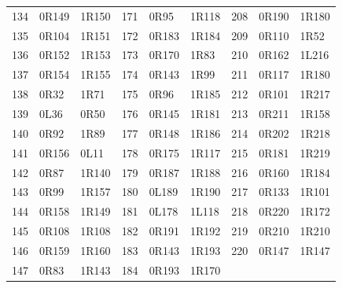 \begin{center}
\begin{tabular}{rll@{\qquad}rll@{\qquad}rll}
134 & 0R149 & 1R150 & 171 & 0R95 & 1R118 & 208 & 0R190 & 1R180\\
135 & 0R104 & 1R151 & 172 & 0R183 & 1R184 & 209 & 0R110 & 1R52\\
136 & 0R152 & 1R153 & 173 & 0R170 & 1R83 & 210 & 0R162 & 1L216\\
137 & 0R154 & 1R155 & 174 & 0R143 & 1R99 & 211 & 0R117 & 1R180\\
138 & 0R32 & 1R71 & 175 & 0R96 & 1R185 & 212 & 0R101 & 1R217\\
139 & 0L36 & 0R50 & 176 & 0R145 & 1R181 & 213 & 0R211 & 1R158\\
140 & 0R92 & 1R89 & 177 & 0R148 & 1R186 & 214 & 0R202 & 1R218\\
141 & 0R156 & 0L11 & 178 & 0R175 & 1R117 & 215 & 0R181 & 1R219\\
142 & 0R87 & 1R140 & 179 & 0R187 & 1R188 & 216 & 0R160 & 1R184\\
143 & 0R99 & 1R157 & 180 & 0L189 & 1R190 & 217 & 0R133 & 1R101\\
144 & 0R158 & 1R149 & 181 & 0L178 & 1L118 & 218 & 0R220 & 1R172\\
145 & 0R108 & 1R108 & 182 & 0R191 & 1R192 & 219 & 0R210 & 1R210\\
146 & 0R159 & 1R160 & 183 & 0R143 & 1R193 & 220 & 0R147 & 1R147\\
147 & 0R83 & 1R143 & 184 & 0R193 & 1R170 &  & & \\
\bottomrule
\end{tabular}
\end{center}
\normalsize
